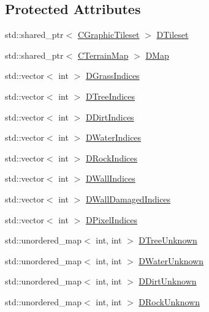 \subsection*{Protected Attributes}
\begin{DoxyCompactItemize}
\item 
std\+::shared\+\_\+ptr$<$ \hyperlink{classCGraphicTileset}{C\+Graphic\+Tileset} $>$ \hyperlink{classCMapRenderer_ace0648cba050b5e02431096edd15b836}{D\+Tileset}
\item 
std\+::shared\+\_\+ptr$<$ \hyperlink{classCTerrainMap}{C\+Terrain\+Map} $>$ \hyperlink{classCMapRenderer_ab9a199c61aa1c87a3248af3085d8ba52}{D\+Map}
\item 
std\+::vector$<$ int $>$ \hyperlink{classCMapRenderer_abea42ed77fce8a53ef0cfd6c82a5d676}{D\+Grass\+Indices}
\item 
std\+::vector$<$ int $>$ \hyperlink{classCMapRenderer_a56708493a1499c671f4378204a0bfcb2}{D\+Tree\+Indices}
\item 
std\+::vector$<$ int $>$ \hyperlink{classCMapRenderer_a5916c26aa5bedf8367a8f3f7efb457bf}{D\+Dirt\+Indices}
\item 
std\+::vector$<$ int $>$ \hyperlink{classCMapRenderer_af82295ac61f841481490da6f2b433db2}{D\+Water\+Indices}
\item 
std\+::vector$<$ int $>$ \hyperlink{classCMapRenderer_ac9178a9c9d30ac44aed7d324c51164a4}{D\+Rock\+Indices}
\item 
std\+::vector$<$ int $>$ \hyperlink{classCMapRenderer_a5ba880d6fb399fc678321cb1daa2e856}{D\+Wall\+Indices}
\item 
std\+::vector$<$ int $>$ \hyperlink{classCMapRenderer_a032989788e978e11147ab8603d875771}{D\+Wall\+Damaged\+Indices}
\item 
std\+::vector$<$ int $>$ \hyperlink{classCMapRenderer_af636936c20248c3ee6cb6ec46f18f077}{D\+Pixel\+Indices}
\item 
std\+::unordered\+\_\+map$<$ int, int $>$ \hyperlink{classCMapRenderer_a55024ab05d176fcc6b60031aef47e1c8}{D\+Tree\+Unknown}
\item 
std\+::unordered\+\_\+map$<$ int, int $>$ \hyperlink{classCMapRenderer_a4b2db86f9cb097d28e0bb3b29eb90194}{D\+Water\+Unknown}
\item 
std\+::unordered\+\_\+map$<$ int, int $>$ \hyperlink{classCMapRenderer_ab899664d372da1c8e4b5802c9e720173}{D\+Dirt\+Unknown}
\item 
std\+::unordered\+\_\+map$<$ int, int $>$ \hyperlink{classCMapRenderer_a28aa9c33d5d2eeae0ef7c23e59712274}{D\+Rock\+Unknown}
\end{DoxyCompactItemize}


